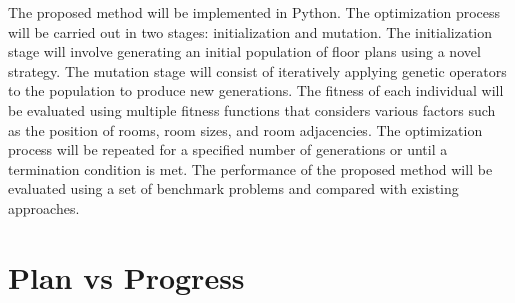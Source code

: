 \documentclass[]{article}
\begin{document}
The proposed method will be implemented in Python. The optimization process will be carried out in two stages: initialization and mutation. The initialization stage will involve generating an initial population of floor plans using a novel strategy. The mutation stage will consist of iteratively applying genetic operators to the population to produce new generations. The fitness of each individual will be evaluated using multiple fitness functions that considers various factors such as the position of rooms, room sizes, and room adjacencies. The optimization process will be repeated for a specified number of generations or until a termination condition is met. The performance of the proposed method will be evaluated using a set of benchmark problems and compared with existing approaches.


\section{Plan vs Progress}
\end{document}
